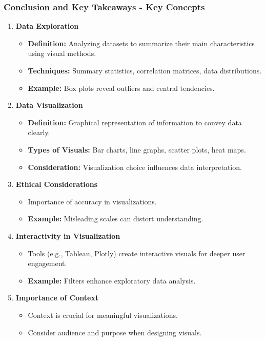 \documentclass[aspectratio=169]{beamer}
\begin{document}
\begin{frame}[fragile]
    \frametitle{Conclusion and Key Takeaways - Key Concepts}
    \begin{enumerate}
        \item \textbf{Data Exploration}
        \begin{itemize}
            \item \textbf{Definition:} Analyzing datasets to summarize their main characteristics using visual methods.
            \item \textbf{Techniques:} Summary statistics, correlation matrices, data distributions.
            \item \textbf{Example:} Box plots reveal outliers and central tendencies.
        \end{itemize}
        
        \item \textbf{Data Visualization}
        \begin{itemize}
            \item \textbf{Definition:} Graphical representation of information to convey data clearly.
            \item \textbf{Types of Visuals:} Bar charts, line graphs, scatter plots, heat maps.
            \item \textbf{Consideration:} Visualization choice influences data interpretation.
        \end{itemize}
        
        \item \textbf{Ethical Considerations}
        \begin{itemize}
            \item Importance of accuracy in visualizations.
            \item \textbf{Example:} Misleading scales can distort understanding.
        \end{itemize}
        
        \item \textbf{Interactivity in Visualization}
        \begin{itemize}
            \item Tools (e.g., Tableau, Plotly) create interactive visuals for deeper user engagement.
            \item \textbf{Example:} Filters enhance exploratory data analysis.
        \end{itemize}
        
        \item \textbf{Importance of Context}
        \begin{itemize}
            \item Context is crucial for meaningful visualizations.
            \item Consider audience and purpose when designing visuals.
        \end{itemize}
    \end{enumerate}
\end{frame}
\end{document}
